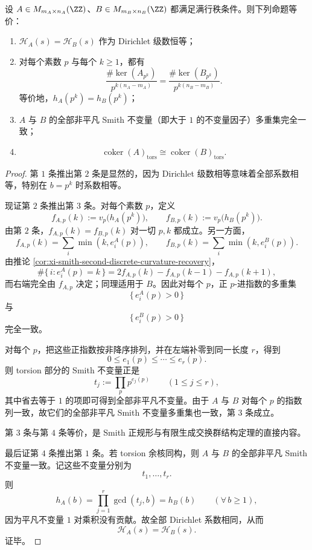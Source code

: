 \begin{theorem}\label{thm:xi-smith-dirichlet-complete-torsion-invariant}
设 \(A\in M_{m_A\times n_A}(\ZZ)\)、\(B\in M_{m_B\times n_B}(\ZZ)\) 都满足满行秩条件。则下列命题等价：
\begin{enumerate}
  \item \(\mathcal H_A(s)=\mathcal H_B(s)\) 作为 Dirichlet 级数恒等；
  \item 对每个素数 \(p\) 与每个 \(k\ge 1\)，都有
  \[
  \frac{\#\ker(A_{p^k})}{p^{k(n_A-m_A)}}
  =
  \frac{\#\ker(B_{p^k})}{p^{k(n_B-m_B)}}.
  \]
  等价地，\(h_A(p^k)=h_B(p^k)\)；
  \item \(A\) 与 \(B\) 的全部非平凡 Smith 不变量（即大于 \(1\) 的不变量因子）多重集完全一致；
  \item
  \[
  \operatorname{coker}(A)_{\mathrm{tors}}
  \cong
  \operatorname{coker}(B)_{\mathrm{tors}}.
  \]
\end{enumerate}
\end{theorem}
\begin{proof}
第 \(1\) 条推出第 \(2\) 条是显然的，因为 Dirichlet 级数相等意味着全部系数相等，特别在 \(b=p^k\) 时系数相等。

现证第 \(2\) 条推出第 \(3\) 条。对每个素数 \(p\)，定义
\[
f_{A,p}(k):=v_p\!\bigl(h_A(p^k)\bigr),
\qquad
f_{B,p}(k):=v_p\!\bigl(h_B(p^k)\bigr).
\]
由第 \(2\) 条，\(f_{A,p}(k)=f_{B,p}(k)\) 对一切 \(p,k\) 都成立。另一方面，
\[
f_{A,p}(k)=\sum_i \min(k,e_i^A(p)),
\qquad
f_{B,p}(k)=\sum_i \min(k,e_i^B(p)).
\]
由推论 \ref{cor:xi-smith-second-discrete-curvature-recovery}，
\[
\#\{\,i:e_i^A(p)=k\,\}
=
2f_{A,p}(k)-f_{A,p}(k-1)-f_{A,p}(k+1),
\]
而右端完全由 \(f_{A,p}\) 决定；同理适用于 \(B\)。因此对每个 \(p\)，正 \(p\)-进指数的多重集
\[
\{\,e_i^A(p)>0\,\}
\]
与
\[
\{\,e_i^B(p)>0\,\}
\]
完全一致。

对每个 \(p\)，把这些正指数按非降序排列，并在左端补零到同一长度 \(r\)，得到
\[
0\le e_1(p)\le \cdots \le e_r(p).
\]
则 torsion 部分的 Smith 不变量正是
\[
t_j:=\prod_{p}p^{e_j(p)}
\qquad (1\le j\le r),
\]
其中省去等于 \(1\) 的项即可得到全部非平凡不变量。由于 \(A\) 与 \(B\) 对每个 \(p\) 的指数列一致，故它们的全部非平凡 Smith 不变量多重集也一致，第 \(3\) 条成立。

第 \(3\) 条与第 \(4\) 条等价，是 Smith 正规形与有限生成交换群结构定理的直接内容。

最后证第 \(4\) 条推出第 \(1\) 条。若 torsion 余核同构，则 \(A\) 与 \(B\) 的全部非平凡 Smith 不变量一致。记这些不变量分别为
\[
t_1,\dots,t_r.
\]
则
\[
h_A(b)=\prod_{j=1}^{r}\gcd(t_j,b)=h_B(b)
\qquad (\forall\, b\ge 1),
\]
因为平凡不变量 \(1\) 对乘积没有贡献。故全部 Dirichlet 系数相同，从而
\[
\mathcal H_A(s)=\mathcal H_B(s).
\]
证毕。
\end{proof}

